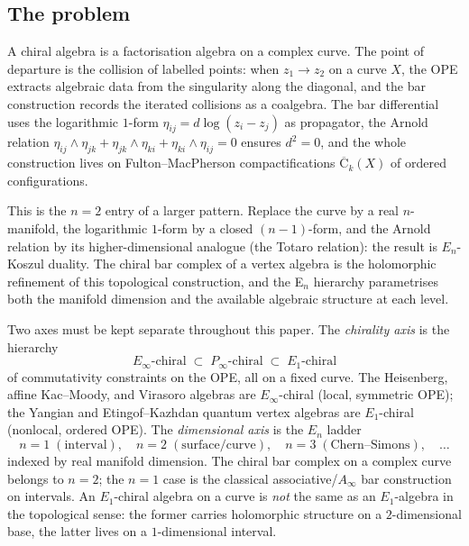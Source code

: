 \documentclass[11pt,reqno]{amsart}
\theoremstyle{definition}
\theoremstyle{remark}
\providecommand{\FM}{\overline{\mathrm{C}}}
\providecommand{\Ainf}{A_\infty}
\providecommand{\Eone}{E_1}
\providecommand{\En}{E_n}
\providecommand{\Einf}{E_\infty}
\begin{document}
\subsection{The problem}

A chiral algebra is a factorisation algebra on a complex curve.
The point of departure is the collision of labelled points:
when $z_1 \to z_2$ on a curve $X$, the OPE extracts algebraic
data from the singularity along the diagonal, and the bar
construction records the iterated collisions as a coalgebra.
The bar differential uses the logarithmic $1$-form
$\eta_{ij} = d\log(z_i - z_j)$ as propagator, the Arnold
relation $\eta_{ij}\wedge\eta_{jk} + \eta_{jk}\wedge\eta_{ki}
+ \eta_{ki}\wedge\eta_{ij} = 0$ ensures $d^2 = 0$, and the
whole construction lives on Fulton--MacPherson compactifications
$\FM_k(X)$ of ordered configurations.

This is the $n = 2$ entry of a larger pattern. Replace the curve
by a real $n$-manifold, the logarithmic $1$-form by a closed
$(n{-}1)$-form, and the Arnold relation by its higher-dimensional
analogue (the Totaro relation): the result is $\En$-Koszul duality.
The chiral bar complex of a vertex algebra is the holomorphic
refinement of this topological construction, and the E$_n$ hierarchy
parametrises both the manifold dimension and the available algebraic
structure at each level.

Two axes must be kept separate throughout this paper. The
\emph{chirality axis} is the hierarchy
\begin{equation}\label{eq:chirality-hierarchy}
\Einf\text{-chiral}
\;\subset\;
P_\infty\text{-chiral}
\;\subset\;
\Eone\text{-chiral}
\end{equation}
of commutativity constraints on the OPE, all on a fixed curve.
The Heisenberg, affine Kac--Moody, and Virasoro algebras are
$\Einf$-chiral (local, symmetric OPE); the Yangian and
Etingof--Kazhdan quantum vertex algebras are $\Eone$-chiral
(nonlocal, ordered OPE). The \emph{dimensional axis} is the
$\En$ ladder
\begin{equation}\label{eq:en-ladder}
n = 1 \;(\text{interval}),
\quad
n = 2 \;(\text{surface/curve}),
\quad
n = 3 \;(\text{Chern--Simons}),
\quad
\ldots
\end{equation}
indexed by real manifold dimension. The chiral bar complex on
a complex curve belongs to $n = 2$; the $n = 1$ case is the
classical associative/$\Ainf$ bar construction on intervals.
An $\Eone$-chiral algebra on a curve is \emph{not} the same as
an $\Eone$-algebra in the topological sense: the former carries
holomorphic structure on a $2$-dimensional base, the latter lives
on a $1$-dimensional interval.
\end{document}
